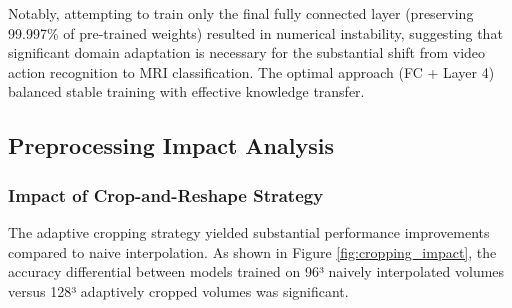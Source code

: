 \documentclass[12pt, a4paper]{article}
\begin{document}
Notably, attempting to train only the final fully connected layer (preserving 99.997\% of pre-trained weights) resulted in numerical instability, suggesting that significant domain adaptation is necessary for the substantial shift from video action recognition to MRI classification. The optimal approach (FC + Layer 4) balanced stable training with effective knowledge transfer.

\subsection{Preprocessing Impact Analysis}

\subsubsection{Impact of Crop-and-Reshape Strategy}

The adaptive cropping strategy yielded substantial performance improvements compared to naive interpolation. As shown in Figure \ref{fig:cropping_impact}, the accuracy differential between models trained on 96³ naively interpolated volumes versus 128³ adaptively cropped volumes was significant.
\end{document}
